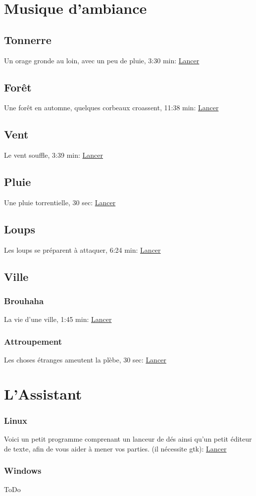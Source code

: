 \section{Musique d'ambiance}
\subsection{Tonnerre}
Un orage gronde au loin, avec un peu de pluie, 3:30 min: \href{run:./Ressources/medieval/Tonnerre.ogg}{Lancer}
\subsection{Forêt}
Une forêt en automne, quelques corbeaux croassent, 11:38 min: \href{run:./Ressources/medieval/Foret.ogg}{Lancer}
\subsection{Vent}
Le vent souffle, 3:39 min: \href{run:./Ressources/medieval/Vent.ogg}{Lancer}
\subsection{Pluie}
Une pluie torrentielle, 30 sec: \href{run:./Ressources/medieval/Pluie.ogg}{Lancer}
\subsection{Loups}
Les loups se préparent à attaquer, 6:24 min: \href{run:./Ressources/medieval/Loups.ogg}{Lancer}
\subsection{Ville}
\subsubsection{Brouhaha}
La vie d'une ville, 1:45 min: \href{run:./Ressources/medieval/Brouhaha_ville.ogg}{Lancer}
\subsubsection{Attroupement}
Les choses étranges ameutent la plèbe, 30 sec: \href{run:./Ressources/medieval/Attroupement.ogg}{Lancer}
\section{L'Assistant}
\subsubsection{Linux}
Voici un petit programme comprenant un lanceur de dés ainsi qu'un petit éditeur de texte, afin de vous aider à mener vos parties. (il nécessite gtk): \href{run:./Ressources/CreareMundum_Assistant/CreareMundum_Assistant_linux.py}{Lancer}
\subsubsection{Windows}
ToDo